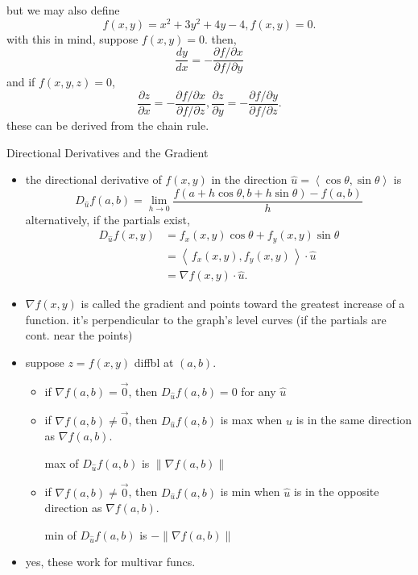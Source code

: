 \documentclass[11pt]{article}
\theoremstyle{definition}
\newcommand{\col}[1]{\begin{minipage}{\columnwidth}#1\end{minipage}}
\newcommand{\magn}[1]{\left\lVert #1 \right\rVert}
\begin{document}
\begin{multicols}{2}
{\begin{itemize}
      but we may also define 
      \[ f(x,y) = x^2 + 3y^2 + 4y - 4, f(x,y) = 0.\]
      with this in mind, suppose $f(x,y)=0$. then,
      \[ \frac{dy}{dx} = -\frac{\partial f/\partial x}{\partial f/\partial y} \]
      and if $f(x,y,z) = 0$,
      \[ \frac{\partial z}{\partial x} = -\frac{\partial f/\partial x}{\partial f/\partial z}, \frac{\partial z}{\partial y} = -\frac{\partial f/\partial y}{\partial f/\partial z}.\]
      these can be derived from the chain rule.
    \end{itemize}
  }
  \col{
    Directional Derivatives and the Gradient
    \begin{itemize}
      \item the directional derivative of $f(x,y)$ in the direction $\hat{u} = \left<\cos\theta, \sin\theta\right>$ is
      \[ D_{\hat{u}}f(a,b) = \lim_{h\rightarrow 0}\frac{f(a+h\cos\theta, b+h\sin\theta)-f(a,b)}{h}\]
      alternatively, if the partials exist,
      \begin{align*}
        D_{\hat{u}}f(x,y) &= f_x(x,y)\cos\theta + f_y(x,y)\sin\theta \\
        &= \left<\,f_x(x,y), f_y(x,y)\,\right> \cdot \hat{u} \\
        &= \nabla f(x,y) \cdot \hat{u}.
      \end{align*}
      \item $\nabla f(x,y)$ is called the gradient and points toward the greatest increase of a function. it's perpendicular to the graph's level curves (if the partials are cont. near the points)
      \item suppose $z=f(x,y)$ diffbl at $(a,b)$.
      \begin{itemize}
        \item if $\nabla f(a,b) = \vec{0}$, then $D_{\hat{u}}f(a,b) = 0$ for any $\hat{u}$
        \item if $\nabla f(a,b) \ne \vec{0}$, then $D_{\hat{u}}f(a,b)$ is max when $\hat{u}$ is in the same direction as $\nabla f(a,b)$.
        
        max of $D_{\hat{u}}f(a,b)$ is $\magn{\nabla f(a,b)}$
        \item if $\nabla f(a,b) \ne \vec{0}$, then $D_{\hat{u}}f(a,b)$ is min when $\hat{u}$ is in the opposite direction as $\nabla f(a,b)$.
        
        min of $D_{\hat{u}}f(a,b)$ is $-\magn{\nabla f(a,b)}$
      \end{itemize}
      \item yes, these work for multivar funcs.
    \end{itemize}    
  }
\end{multicols}
\end{document}
